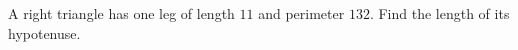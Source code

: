 A right triangle has one leg of length $11$ and perimeter $132$. Find the length of its hypotenuse.
